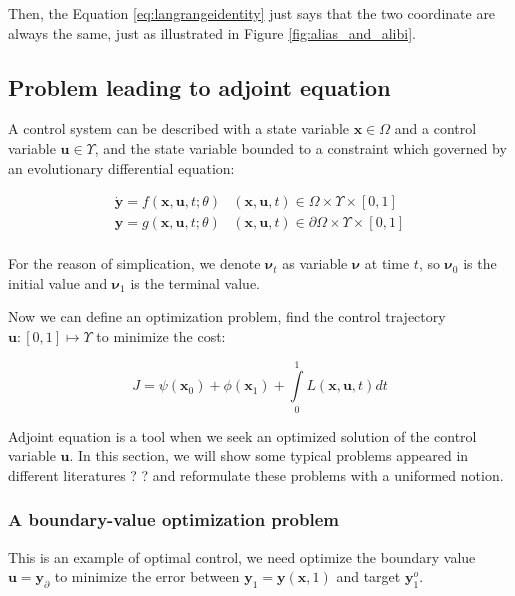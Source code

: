 \documentclass{article}
\begin{document}
Then, the Equation \ref{eq:langrangeidentity} just says that the two coordinate are always the same, just as illustrated in Figure \ref{fig:alias_and_alibi}.

\subsection{Problem leading to adjoint equation}

A control system can be described with a state variable $\mathbf{x} \in \Omega$ and a control variable $\mathbf{u} \in \Upsilon$,
and the state variable bounded to a constraint which governed by an evolutionary differential equation:

\begin{equation}
\begin{array}{ll}
\dot{\mathbf{y}} = f(\mathbf{x}, \mathbf{u}, t; \theta) & (\mathbf{x}, \mathbf{u}, t) \in \Omega \times \Upsilon \times [0, 1] \\
\mathbf{y} = g(\mathbf{x}, \mathbf{u}, t; \theta) & (\mathbf{x}, \mathbf{u}, t) \in \partial \Omega \times \Upsilon \times [0, 1] \\
\end{array}
\end{equation}

For the reason of simplication, we denote $\mathbf{\nu}_t$ as variable $\mathbf{\nu}$ at time $t$,
so $\mathbf{\nu}_0$ is the initial value and $\mathbf{\nu}_1$ is the terminal value.

Now we can define an optimization problem, find the control trajectory $\mathbf{u}:[0,1] \mapsto \Upsilon$ to minimize the cost:

\begin{equation}
J = \psi(\mathbf{x}_0) + \phi(\mathbf{x}_1) + \int\limits_{0}^{1} L(\mathbf{x}, \mathbf{u}, t) dt
\end{equation}

Adjoint equation is a tool when we seek an optimized solution of the control variable $\mathbf{u}$.
In this section, we will show some typical problems appeared in different literatures ? \cite{Liberzon2012CalculusOV}\cite{hall1983physical}\cite{Errico1997WhatIA} ? and reformulate these problems with a uniformed notion.

\subsubsection{A boundary-value optimization problem}

This is an example of optimal control, we need optimize the boundary value $ \mathbf{u} = \mathbf{y}_{\partial} $ to minimize the error between $ \mathbf{y}_1 = \mathbf{y}(\mathbf{x}, 1)$ and target $ \mathbf{y}_1^o $.
\end{document}
